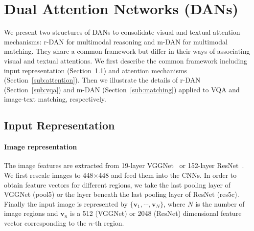 \documentclass[10pt,twocolumn,letterpaper]{article}
\begin{document}
\section{Dual Attention Networks (DANs)}
We present two structures of DANs to consolidate visual and textual attention mechanisms: r-DAN for multimodal reasoning and m-DAN for multimodal matching.
They share a common framework but differ in their ways of associating visual and textual attentions.
We first describe the common framework including input representation (Section~\ref{sub:input}) and attention mechanisms (Section~\ref{sub:attention}).
Then we illustrate the details of r-DAN (Section~\ref{sub:vqa}) and m-DAN (Section~\ref{sub:matching}) applied to VQA and image-text matching, respectively.



\subsection{Input Representation}
\label{sub:input}

\paragraph{Image representation}
The image features are extracted from 19-layer VGGNet~\cite{simonyan2014very} or 152-layer ResNet~\cite{he2016deep}.
We first rescale images to 448$\times$448 and feed them into the CNNs.
In order to obtain feature vectors for different regions, we take the last pooling layer of VGGNet (pool5) or the layer beneath the last pooling layer of ResNet (res5c).
Finally the input image is represented by $\{\mathbf{v}_1,\cdots,\mathbf{v}_N\}$, where $N$ is the number of image regions and $\mathbf{v}_n$ is a 512 (VGGNet) or 2048 (ResNet) dimensional feature vector corresponding to the $n$-th region.
\end{document}
